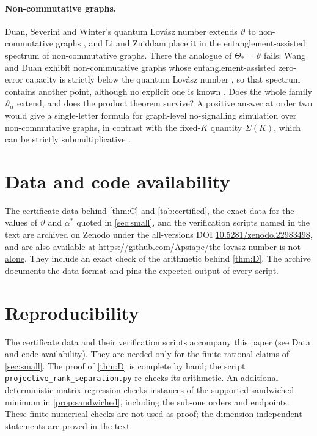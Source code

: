 \documentclass[11pt]{article}
\theoremstyle{definition}
\newcommand{\vt}{\vartheta}
\begin{document}
\paragraph{Non-commutative graphs.}
Duan, Severini and Winter's quantum Lov\'asz number extends $\vt$ to
non-commutative graphs \cite{DSW2013}, and Li and Zuiddam place it in the
entanglement-assisted spectrum of non-commutative graphs.  There the analogue
of $\Theta_*=\vt$ fails: Wang and Duan exhibit non-commutative graphs whose
entanglement-assisted zero-error capacity is strictly below the quantum
Lov\'asz number \cite{WangDuan2018}, so that spectrum contains another point,
although no explicit one is known \cite[Theorem~33 and the remark after
it]{LiZuiddam2020}.  Does the whole family $\vt_\alpha$
extend, and does the product theorem survive?  A positive answer at order two
would give a single-letter formula for graph-level no-signalling simulation
over non-commutative graphs, in contrast with the fixed-$K$ quantity
$\Sigma(K)$, which can be strictly submultiplicative \cite{WangDuan2016}.

\section*{Data and code availability}

The certificate data behind \cref{thm:C} and \cref{tab:certified}, the exact
data for the values of $\vt$ and $\alpha^*$ quoted in \cref{sec:small}, and
the verification scripts named in the text are archived on Zenodo under the
all-versions DOI
\href{https://doi.org/10.5281/zenodo.22983498}{10.5281/zenodo.22983498},
and are also available at
\url{https://github.com/Apsiape/the-lovasz-number-is-not-alone}.  They
include an exact check of the arithmetic behind \cref{thm:D}.  The
archive documents the data format and pins the expected output of every
script.

\section*{Reproducibility}

The certificate data and their verification scripts accompany this paper
(see Data and code availability).
They are needed only for the finite rational claims of \cref{sec:small}.
The proof of \cref{thm:D} is complete by hand; the script
\texttt{projective\_rank\_separation.py} re-checks its arithmetic.
An additional deterministic matrix regression checks instances of the
supported sandwiched minimum in \cref{prop:sandwiched}, including the
sub-one orders and endpoints.  These finite numerical checks are not used
as proof; the dimension-independent statements are proved in the text.
\end{document}
